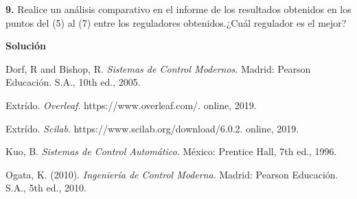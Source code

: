 \documentclass[12pt,letterpaper]{article}
\begin{document}
\bigskip

\bigskip


\textbf{9.} Realice un análisis comparativo en el informe de los resultados obtenidos en los puntos del (5) al (7) entre los reguladores obtenidos.¿Cuál regulador es el mejor?\\

\bigskip

\textbf{Solución}

\bigskip

\begin{thebibliography}{1}
Dorf, R and Bishop, R. \emph{Sistemas de Control Modernos}. Madrid: Pearson Educación. S.A., 10th ed., 2005.

Extrído. \emph{Overleaf}. https://www.overleaf.com/. online, 2019.

Extrído. \emph{Scilab}. https://www.scilab.org/download/6.0.2. online, 2019.

Kuo, B. \emph{Sistemas de Control Automático}. México: Prentice Hall, 7th ed., 1996.

Ogata, K. (2010). \emph{Ingeniería de Control Moderna}. Madrid: Pearson Educación. S.A., 5th ed., 2010.

\end{thebibliography}


\nocite{*}


\end{document}
